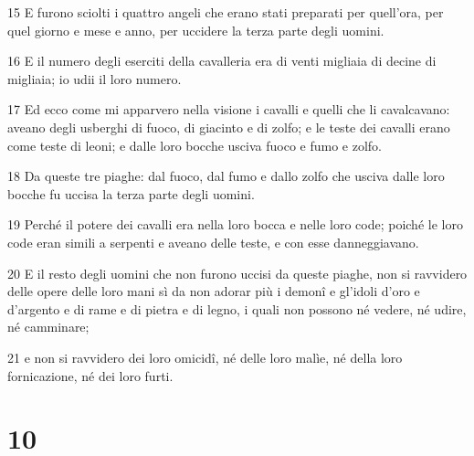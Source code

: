 \par 15 E furono sciolti i quattro angeli che erano stati preparati per quell'ora, per quel giorno e mese e anno, per uccidere la terza parte degli uomini.
\par 16 E il numero degli eserciti della cavalleria era di venti migliaia di decine di migliaia; io udii il loro numero.
\par 17 Ed ecco come mi apparvero nella visione i cavalli e quelli che li cavalcavano: aveano degli usberghi di fuoco, di giacinto e di zolfo; e le teste dei cavalli erano come teste di leoni; e dalle loro bocche usciva fuoco e fumo e zolfo.
\par 18 Da queste tre piaghe: dal fuoco, dal fumo e dallo zolfo che usciva dalle loro bocche fu uccisa la terza parte degli uomini.
\par 19 Perché il potere dei cavalli era nella loro bocca e nelle loro code; poiché le loro code eran simili a serpenti e aveano delle teste, e con esse danneggiavano.
\par 20 E il resto degli uomini che non furono uccisi da queste piaghe, non si ravvidero delle opere delle loro mani sì da non adorar più i demonî e gl'idoli d'oro e d'argento e di rame e di pietra e di legno, i quali non possono né vedere, né udire, né camminare;
\par 21 e non si ravvidero dei loro omicidî, né delle loro malìe, né della loro fornicazione, né dei loro furti.

\chapter{10}

